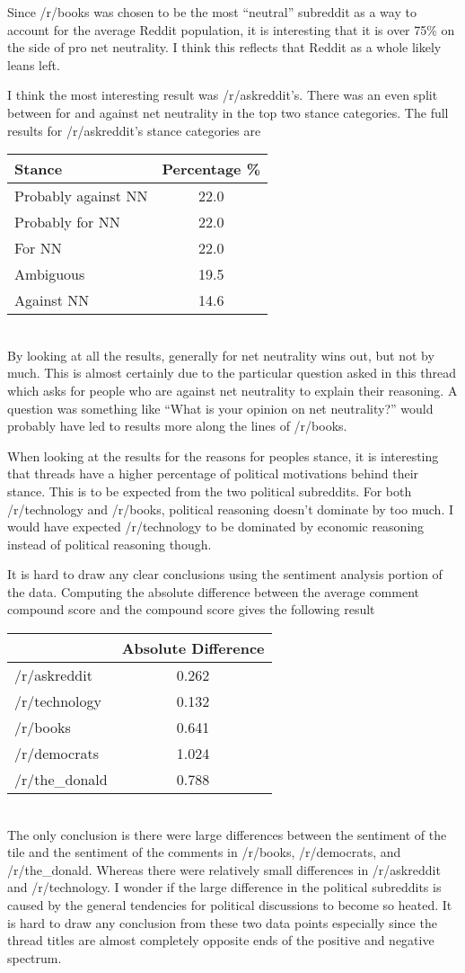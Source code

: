 \documentclass[11pt]{article}
\begin{document}
	Since /r/books was chosen to be the most ``neutral'' subreddit as a way to account for the average Reddit population, it is interesting that it is over 75\% on the side of pro net neutrality. I think this reflects that Reddit as a whole likely leans left. 
	
	I think the most interesting result was /r/askreddit's. There was an even split between for and against net neutrality in the top two stance categories. The full results for /r/askreddit's stance categories are 
	\\[2\baselineskip]
	\begin{tabular}{l|c}
		Stance & Percentage \% \\\hline
		Probably against NN & 22.0 \\
		Probably for NN & 22.0\\
		For NN & 22.0 \\
		Ambiguous & 19.5\\
		Against NN & 14.6
	\end{tabular}
	\\[2\baselineskip]
	By looking at all the results, generally for net neutrality wins out, but not by much. This is almost certainly due to the particular question asked in this thread which asks for people who are against net neutrality to explain their reasoning. A question was something like ``What is your opinion on net neutrality?'' would probably have led to results more along the lines of /r/books. 
	
	When looking at the results for the reasons for peoples stance, it is interesting that threads have a higher percentage of political motivations behind their stance. This is to be expected from the two political subreddits. For both /r/technology and /r/books, political reasoning doesn't dominate by too much. I would have expected /r/technology to be dominated by economic reasoning instead of political reasoning though.  
	
	It is hard to draw any clear conclusions using the sentiment analysis portion of the data. Computing the absolute difference between the average comment compound score and the compound score gives the following result
	\\[2\baselineskip]
	\begin{tabular}{l|c}
		& Absolute Difference \\\hline
		/r/askreddit & 0.262 \\
		/r/technology & 0.132 \\
		/r/books & 0.641  \\
		/r/democrats & 1.024 \\
		/r/the\_donald & 0.788
	\end{tabular}
	\\[2\baselineskip]
	The only conclusion is there were large differences between the sentiment of the tile and the sentiment of the comments in /r/books, /r/democrats, and /r/the\_donald. Whereas there were relatively small differences in /r/askreddit and /r/technology. I wonder if the large difference in the political subreddits is caused by the general tendencies for political discussions to become so heated. It is hard to draw any conclusion from these two data points especially since the thread titles are almost completely opposite ends of the positive and negative spectrum.  
\end{document}
